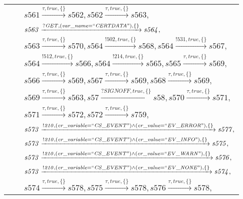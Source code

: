 \begin{tabular}{lcl}
& & $\mathit{s561}\xrightarrow{\mathit{\tau}, \mathit{true}, \{\}}\mathit{s562},\mathit{s562}\xrightarrow{\mathit{\tau}, \mathit{true}, \{\}}\mathit{s563},$ \\
& & $\mathit{s563}\xrightarrow{\mathit{?GET}, \mathit{(var\_name = ``CERTDATA")}, \{\}}\mathit{s564},$ \\
& & $\mathit{s563}\xrightarrow{\mathit{\tau}, \mathit{true}, \{\}}\mathit{s570},\mathit{s564}\xrightarrow{\mathit{!502}, \mathit{true}, \{\}}\mathit{s568},\mathit{s564}\xrightarrow{\mathit{!531}, \mathit{true}, \{\}}\mathit{s567},$ \\
& & $\mathit{s564}\xrightarrow{\mathit{!512}, \mathit{true}, \{\}}\mathit{s566},\mathit{s564}\xrightarrow{\mathit{!214}, \mathit{true}, \{\}}\mathit{s565},\mathit{s565}\xrightarrow{\mathit{\tau}, \mathit{true}, \{\}}\mathit{s569},$ \\
& & $\mathit{s566}\xrightarrow{\mathit{\tau}, \mathit{true}, \{\}}\mathit{s569},\mathit{s567}\xrightarrow{\mathit{\tau}, \mathit{true}, \{\}}\mathit{s569},\mathit{s568}\xrightarrow{\mathit{\tau}, \mathit{true}, \{\}}\mathit{s569},$ \\
& & $\mathit{s569}\xrightarrow{\mathit{\tau}, \mathit{true}, \{\}}\mathit{s563},\mathit{s57}\xrightarrow{\mathit{?SIGNOFF}, \mathit{true}, \{\}}\mathit{s58},\mathit{s570}\xrightarrow{\mathit{\tau}, \mathit{true}, \{\}}\mathit{s571},$ \\
& & $\mathit{s571}\xrightarrow{\mathit{\tau}, \mathit{true}, \{\}}\mathit{s572},\mathit{s572}\xrightarrow{\mathit{\tau}, \mathit{true}, \{\}}\mathit{s759},$ \\
& & $\mathit{s573}\xrightarrow{\mathit{!210}, \mathit{(cr\_variable = ``CS\_EVENT") \land (cr\_value = ``EV\_ERROR")}, \{\}}\mathit{s577},$ \\
& & $\mathit{s573}\xrightarrow{\mathit{!210}, \mathit{(cr\_variable = ``CS\_EVENT") \land (cr\_value = ``EV\_INFO")}, \{\}}\mathit{s575},$ \\
& & $\mathit{s573}\xrightarrow{\mathit{!210}, \mathit{(cr\_variable = ``CS\_EVENT") \land (cr\_value = ``EV\_WARN")}, \{\}}\mathit{s576},$ \\
& & $\mathit{s573}\xrightarrow{\mathit{!210}, \mathit{(cr\_variable = ``CS\_EVENT") \land (cr\_value = ``EV\_NONE")}, \{\}}\mathit{s574},$ \\
& & $\mathit{s574}\xrightarrow{\mathit{\tau}, \mathit{true}, \{\}}\mathit{s578},\mathit{s575}\xrightarrow{\mathit{\tau}, \mathit{true}, \{\}}\mathit{s578},\mathit{s576}\xrightarrow{\mathit{\tau}, \mathit{true}, \{\}}\mathit{s578},$ \\

\end{tabular}
